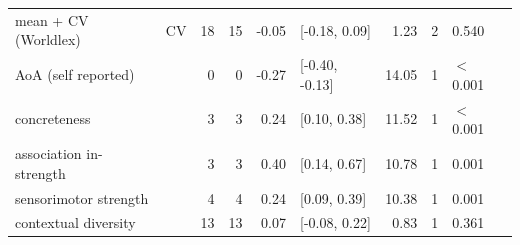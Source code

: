 \begin{table}[ht]
\begin{tabular}{llrrrlrrl}
  mean + CV (Worldlex) & CV & 18 & 15 & -0.05 & [-0.18, 0.09] & 1.23 & 2 & 0.540 \\ 
  AoA (self reported) &  & 0 & 0 & -0.27 & [-0.40, -0.13] & 14.05 & 1 & $<$ 0.001 \\ 
  concreteness &  & 3 & 3 & 0.24 & [0.10, 0.38] & 11.52 & 1 & $<$ 0.001 \\ 
  association in-strength &  & 3 & 3 & 0.40 & [0.14, 0.67] & 10.78 & 1 & 0.001 \\ 
  sensorimotor strength &  & 4 & 4 & 0.24 & [0.09, 0.39] & 10.38 & 1 & 0.001 \\ 
  contextual diversity &  & 13 & 13 & 0.07 & [-0.08, 0.22] & 0.83 & 1 & 0.361 \\ 
   \hline
\end{tabular}
\end{table}
